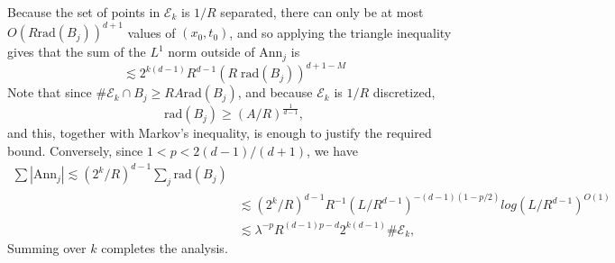 \documentclass[dvipsnames,letterpaper,12pt]{article}
\begin{document}
%
Because the set of points in $\mathcal{E}_k$ is $1/R$ separated, there can only be at most $O(R \text{rad}(B_j))^{d+1}$ values of $(x_0,t_0)$, and so applying the triangle inequality gives that the sum of the $L^1$ norm outside of $\text{Ann}_j$ is
%
\[ \lesssim 2^{k(d-1)}R^{d-1} ( R\; \text{rad}(B_j) )^{d+1-M} \]
%
Note that since $\# \mathcal{E}_k \cap B_j \geq R A \text{rad}(B_j)$, and because $\mathcal{E}_k$ is $1/R$ discretized,
%
\[ \text{rad}(B_j) \geq (A / R)^{\frac{1}{d-1}}, \]
%
and this, together with Markov's inequality, is enough to justify the required bound. Conversely, since $1 < p < 2(d-1)/(d+1)$, we have
%
\begin{align*}
    \sum |\text{Ann}_j| \lesssim (2^k / R)^{d-1} \sum_j \text{rad}(B_j)\\
    &\lesssim (2^k / R)^{d-1} R^{-1} (L / R^{d-1} )^{-(d-1)(1 - p/2)} log(L / R^{d-1})^{O(1)}\\
    &\lesssim \lambda^{-p} R^{(d-1)p - d} 2^{k(d-1)} \# \mathcal{E}_k,
\end{align*}
%
Summing over $k$ completes the analysis.

%
%
%
%
%
%
%
%
%
%

\end{document}
